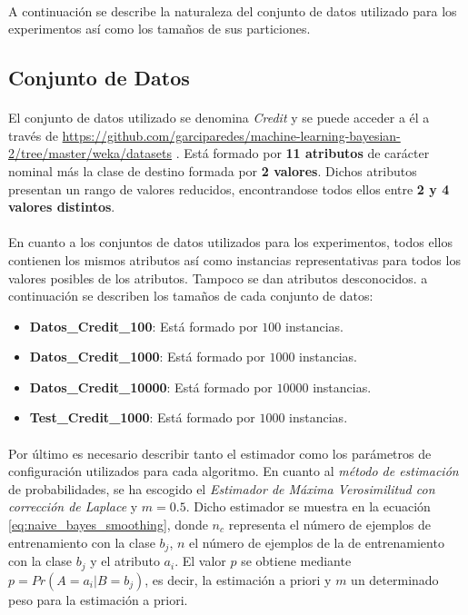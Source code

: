 \documentclass{article}
\begin{document}
		\paragraph{}
		A continuación se describe la naturaleza del conjunto de datos utilizado para los experimentos así como los tamaños de sus particiones.

		\subsection{Conjunto de Datos}
		\label{sec:data_set}

			\paragraph{}
			El conjunto de datos utilizado se denomina \emph{Credit} y se puede acceder a él a través de \url{https://github.com/garciparedes/machine-learning-bayesian-2/tree/master/weka/datasets} \cite{garciparedes:machine-learning-bayesian-2}. Está formado por \textbf{11 atributos} de carácter nominal más la clase de destino formada por \textbf{2 valores}. Dichos atributos presentan un rango de valores reducidos, encontrandose todos ellos entre \textbf{2 y 4 valores distintos}.

			\paragraph{}
			En cuanto a los conjuntos de datos utilizados para los experimentos, todos ellos contienen los mismos atributos así como instancias representativas para todos los valores posibles de los atributos. Tampoco se dan atributos desconocidos. a continuación se describen los tamaños de cada conjunto de datos:

			\begin{itemize}
				\item \textbf{Datos\_Credit\_100}: Está formado por $100$ instancias.
				\item \textbf{Datos\_Credit\_1000}: Está formado por $1000$ instancias.
				\item \textbf{Datos\_Credit\_10000}: Está formado por $10000$ instancias.
				\item \textbf{Test\_Credit\_1000}: Está formado por $1000$ instancias.
			\end{itemize}

			\paragraph{}
			Por último es necesario describir tanto el estimador como los parámetros de configuración utilizados para cada algoritmo. En cuanto al \emph{método de estimación} de probabilidades, se ha escogido el \emph{Estimador de Máxima Verosimilitud con corrección de Laplace} y $m = 0.5$. Dicho estimador se muestra en la ecuación \eqref{eq:naive_bayes_smoothing}, donde $n_c$ representa el número de ejemplos de entrenamiento con la clase $b_j$, $n$ el número de ejemplos de la de entrenamiento con la clase $b_j$ y el atributo $a_i$. El valor $p$ se obtiene mediante $p = Pr(A = a_i | B = b_j)$, es decir, la estimación a priori y $m$ un determinado peso para la estimación a priori.
\end{document}
